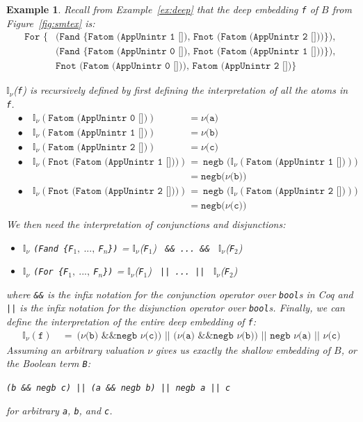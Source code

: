 \documentclass[11pt]{article}
\newtheorem{example}{Example}[section]
\newcommand{\avar}{Fatom (AppUnintr 0 [])}
\newcommand{\bvar}{Fatom (AppUnintr 1 [])}
\newcommand{\cvar}{Fatom (AppUnintr 2 [])}
\newcommand{\fnot}[1]{Fnot (#1)}
\newcommand{\intr}[1]{\mathbb{I}_{\nu}(#1)}
\begin{document}
	\begin{example}
		\em Recall from Example~\ref{ex:deep}
		that the deep embedding
		\texttt{f} of $B$ from 
		Figure~\ref{fig:smtex} is:
		\begin{align*}
			\texttt{For \{}
			&\texttt{(Fand \{\bvar,\ 
				\fnot{\cvar}\}), }\\
			&\texttt{(Fand \{\avar,\ 
				\fnot{\bvar}\}), }\\
			&\texttt{\fnot \avar, 
				\cvar\}}  
		\end{align*}

		$\mathbb{I}_{\nu}$(\texttt{f}) 
		is recursively defined
		by first defining the interpretation
		of all the atoms in \texttt{f}.
		\begin{align*}
			&\bullet\quad \intr{\texttt{\avar}} 
			&= \texttt{$\nu$(a)}\\
			&\bullet\quad \intr{\texttt{\bvar}} 
			&= \texttt{$\nu$(b)}\\
			&\bullet\quad \intr{\texttt{\cvar}} 
			&= \texttt{$\nu$(c)}\\
			&\bullet\quad \intr{\texttt{\fnot{\bvar}}} &= \ 
			\texttt{negb (}\intr{\texttt{\bvar}}\texttt{)}\\
			& &= \texttt{negb(}\nu
			\texttt{(b))}\\
			&\bullet\quad \intr{\texttt{\fnot{\cvar}}} &= \ 
			\texttt{negb (}\intr{\texttt{\cvar}}\texttt{)}\\
			& &= \texttt{negb(}\nu
			\texttt{(c))}\\
		\end{align*}
		We then need the interpretation of 
		conjunctions and disjunctions:
		\begin{itemize}
			\item$\mathbb{I}_{\nu}$
			\texttt{(Fand \{F$_1,\ ...,\ $F$_n$\})} = 
			$\mathbb{I}_{\nu}$(\texttt{F$_1$})
			\texttt{ \&\& ... \&\& }
			$\mathbb{I}_{\nu}$(\texttt{F$_2$})
			\item$\mathbb{I}_{\nu}$
			\texttt{(For \{F$_1,\ ...,\ $F$_n$\})} = 
			$\mathbb{I}_{\nu}$(\texttt{F$_1$})
			\texttt{ || ... || }
			$\mathbb{I}_{\nu}$(\texttt{F$_2$})
		\end{itemize}
		where \texttt{\&\&} is the infix notation
		for the conjunction operator over 
		\texttt{bool}s in Coq 
		and \texttt{||} is the 
		infix notation for the disjunction operator 
		over \texttt{bool}s. Finally, we can define 
		the interpretation 
		of the entire deep embedding of \texttt{f}:
		\begin{align*}
			\intr{\texttt{f}}\ &=\ 
			\texttt{($\nu$(b) \&\& negb $\nu$(c)) ||
					($\nu$(a) \&\& negb $\nu$(b)) ||
					negb $\nu$(a) ||
					$\nu$(c)}
		\end{align*}
		Assuming an arbitrary valuation 
		$\nu$ gives us exactly the shallow 
		embedding of $B$, or the Boolean
		term \texttt{B}:
		\begin{center}
			\texttt{(b \&\& negb c) || (a 
				\&\& negb b) || negb a || c}
		\end{center}
		for arbitrary \texttt{a}, \texttt{b},
		and \texttt{c}.
		

\end{example}
\end{document}
